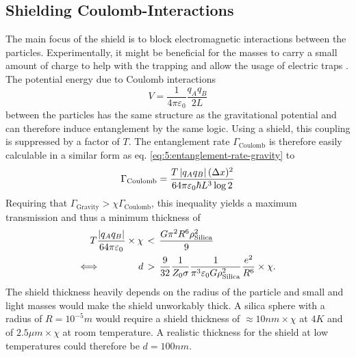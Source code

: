 \subsection{Shielding Coulomb-Interactions}
The main focus of the shield is to block electromagnetic interactions between the particles.
Experimentally, it might be beneficial for the masses to carry a small amount of charge to help with the trapping and allow the usage of electric traps \cite{GonzalezBallestero_2021}.
The potential energy due to Coulomb interactions
\begin{equation}
  V = \frac{1}{4\pi\varepsilon_0} \frac{q_A q_B}{2L}
\end{equation}
between the particles has the same structure as the gravitational potential and can therefore induce entanglement by the same logic.
Using a shield, this coupling is suppressed by a factor of $T$.
The entanglement rate $\Gamma_\mathrm{Coulomb}$ is therefore easily calculable in a similar form as eq. \eqref{eq:5:entanglement-rate-gravity} to
\begin{equation}\label{eq:5:entanglement-rate-coulomb}
  \Gamma_\mathrm{Coulomb} = \frac{T \left\lvert q_A q_B\right\rvert (\Delta x)^2}{64 \pi \varepsilon_0 \hbar L^3 \log 2}
\end{equation}
Requiring that $\Gamma_\mathrm{Gravity} > \chi \Gamma_\mathrm{Coulomb}$, this inequality yields a maximum transmission and thus a minimum thickness of
\begin{align}\label{eq:5:coulomb-gravity-condition}
  T \frac{\left\lvert q_A q_B\right\rvert}{64 \pi \varepsilon_0} \times \chi \, &< \, \frac{G \pi^2 R^6 \rho_\mathrm{Silica}^2}{9} \\
  \Longleftrightarrow \quad\quad\quad\quad d \, &> \, \frac{9}{32}\frac{1}{Z_0 \sigma} \frac{1}{\pi^3 \varepsilon_0 G \rho_\mathrm{Silica}^2} \frac{e^2}{R^6} \times \chi .
\end{align}
The shield thickness heavily depends on the radius of the particle and small and light masses would make the shield unworkably thick.
A silica sphere with a radius of $R=10^{-5}\si{m}$ would require a shield thickness of $\approx 10\si{nm}\times\chi$ at $4\si{K}$ and of $2.5\si{\mu m}\times\chi$ at room temperature.
A realistic thickness for the shield at low temperatures could therefore be $d=100\si{nm}$.


